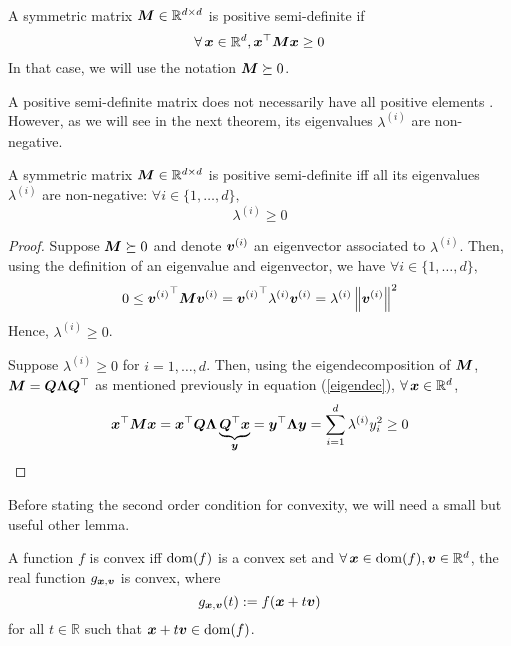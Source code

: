 \documentclass{article}
\newcommand{\R}{\mathbb{R}}
\begin{document}
\begin{defn}
A symmetric matrix $\mM \in \R^{d \times d}$ is positive semi-definite if
\[
\forall \vx \in \R^d, \vx^\top \mM \vx \geq 0
\]
In that case, we will use the notation ${\bm{M}} \succeq 0$.
\end{defn}{}

A positive semi-definite matrix does not necessarily have all positive elements \footnotemark[5]. However, as we will see in the next theorem, its eigenvalues $\lambda^{(i)}$ are non-negative.

\begin{thm}
A symmetric matrix $\mM \in \R^{d \times d}$ is positive semi-definite iff all its eigenvalues $\lambda^{(i)}$ are non-negative: $\forall i \in \{1,\ldots,d\},$
\[
    \lambda^{(i)} \geq 0
\]
\end{thm}{}

\begin{proof}
Suppose ${\bm{M}} \succeq 0$ and denote ${\bm{v}}^{(i)}$ an eigenvector associated to $\lambda^{(i)}$. Then, using the definition of an eigenvalue and eigenvector, we have $\forall i \in \{1,\ldots,d\},$
\[
0 \leq {{\bm{v}}^{(i)}}^\top {\bm{M}} {\bm{v}}^{(i)} = {{\bm{v}}^{(i)}}^\top \lambda^{(i)} {\bm{v}}^{(i)} = \lambda^{(i)} \left\|{\bm{v}}^{(i)}\right\|^2
\]
Hence, $\lambda^{(i)}\geq 0$.

Suppose $\lambda^{(i)} \geq 0$ for $i=1,\ldots,d$. Then, using the eigendecomposition of ${\bm{M}}$, ${\bm{M}} = {\bm{Q}} {\bm{\Lambda}} {\bm{Q}}^\top$ as mentioned previously in equation (\ref{eigendec}), $\forall \vx \in \R^d$,
\[
    {\bm{x}}^\top {\bm{M}} {\bm{x}} = {\bm{x}}^\top {\bm{Q}} {\bm{\Lambda}} \underbrace{{\bm{Q}}^\top {\bm{x}}}_{{\bm{y}}} = {\bm{y}}^\top {\bm{\Lambda}} {\bm{y}} = \sum_{i=1}^d \lambda^{(i)} y_i^2\geq 0
\]
\end{proof}

Before stating the second order condition for convexity, we will need a small but useful other lemma.

\begin{lemma}\label{line}
A function $f$ is convex iff $\operatorname{dom}(f)$ is a convex set and $\forall \vx \in \dom(f), \vv \in \R^d$, the real function $g_{{\bm{x}},{\bm{v}}}$ is convex, where
\[
g_{{\bm{x}},{\bm{v}}}(t) := f({\bm{x}} + t{\bm{v}})
\]
for all $t\in \R$ such that ${\bm{x}} + t{\bm{v}} \in \operatorname{dom}(f)$.
\end{lemma}{}
\end{document}
